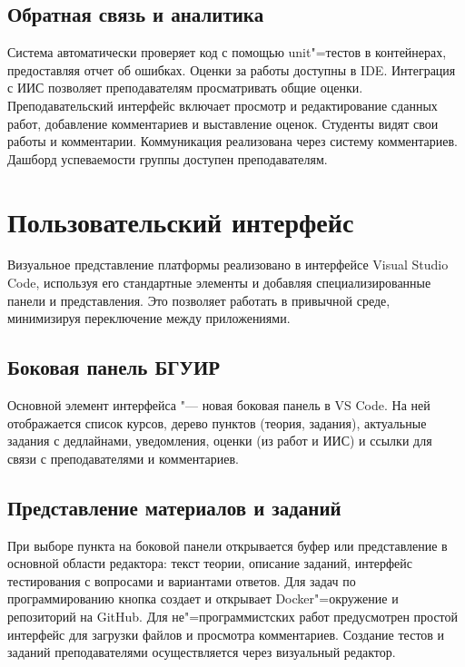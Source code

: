 \documentclass{bsuir}
\begin{document}
\subsection{Обратная связь и аналитика}

Система автоматически проверяет код с помощью unit"=тестов в контейнерах,
предоставляя отчет об ошибках. Оценки за работы доступны в IDE. Интеграция с ИИС
позволяет преподавателям просматривать общие оценки. Преподавательский интерфейс
включает просмотр и редактирование сданных работ, добавление комментариев и
выставление оценок. Студенты видят свои работы и комментарии. Коммуникация
реализована через систему комментариев. Дашборд успеваемости группы доступен
преподавателям.

\section{Пользовательский интерфейс}

Визуальное представление платформы реализовано в интерфейсе Visual Studio Code,
используя его стандартные элементы и добавляя специализированные панели и
представления. Это позволяет работать в привычной среде, минимизируя
переключение между приложениями.

\subsection{Боковая панель БГУИР}

Основной элемент интерфейса "--- новая боковая панель в VS Code. На ней
отображается список курсов, дерево пунктов (теория, задания), актуальные задания
с дедлайнами, уведомления, оценки (из работ и ИИС) и ссылки для связи с
преподавателями и комментариев.

\subsection{Представление материалов и заданий}

При выборе пункта на боковой панели открывается буфер или представление в
основной области редактора: текст теории, описание заданий, интерфейс
тестирования с вопросами и вариантами ответов. Для задач по программированию
кнопка  создает и открывает Docker"=окружение и
репозиторий на GitHub. Для не"=программистских работ предусмотрен простой
интерфейс для загрузки файлов и просмотра комментариев. Создание тестов и
заданий преподавателями осуществляется через визуальный редактор.
\end{document}
